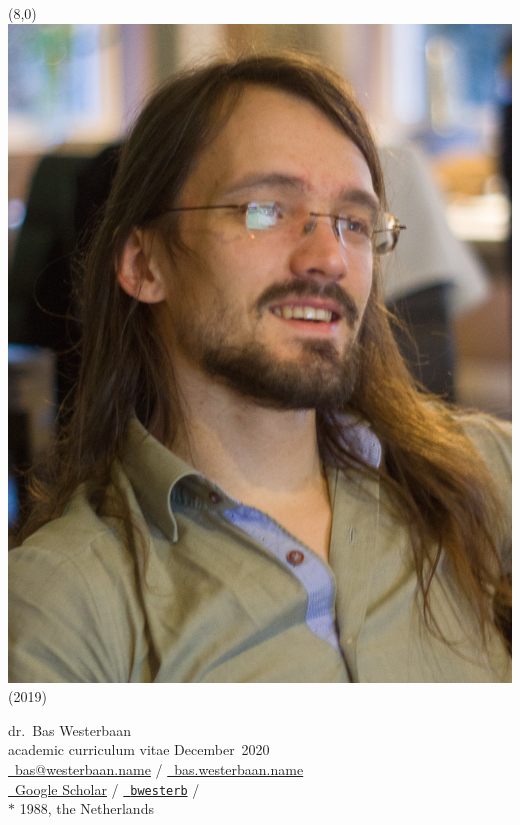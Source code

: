 \documentclass{article}
\newcommand\hsep{ {\color{gray}/} }
\begin{document}
\begin{textblock}{2}(8,0)
    \noindent
\includegraphics[width=\textwidth]{me}
        \footnotesize(2019)
\end{textblock}\noindent
\textsf{\Large dr.~Bas Westerbaan}\\
academic curriculum vitae December~2020\\

\noindent
\href{mailto:bas@westerbaan.name}{\faEnvelopeO\ bas@westerbaan.name} \hsep
\href{https://bas.westerbaan.name}{\faExternalLink\ bas.westerbaan.name}\\
\href{https://scholar.google.nl/citations?user=AN7BEa8AAAAJ}{%
    \faGraduationCap\ Google Scholar}
    \hsep \href{https://github.com/bwesterb}{\faGithub\ \texttt{bwesterb}}
    \hsep \href{https://www.linkedin.com/in/baswesterbaan/}{\faLinkedinSquare} \\
$*$ 1988, the Netherlands
\end{document}
